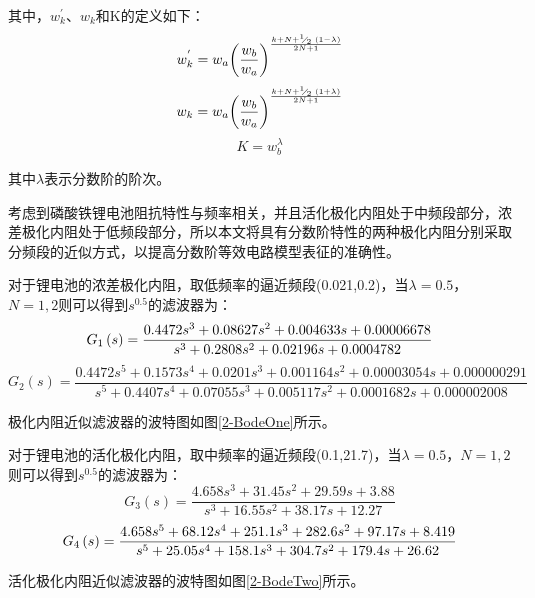 其中，$w_{k}^{'}$、${{w}_{k}}$和K的定义如下：
\begin{equation}
w_{k}^{'}={{w}_{a}}{{\left( \frac{{{w}_{b}}}{{{w}_{a}}} \right)}^{\frac{k+N+{}^{1}\!\!\diagup\!\!{}_{2}\;\left( 1-\lambda  \right)}{2N+1}}}
\end{equation}
\begin{equation}
{{w}_{k}}={{w}_{a}}{{\left( \frac{{{w}_{b}}}{{{w}_{a}}} \right)}^{\frac{k+N+{}^{1}\!\!\diagup\!\!{}_{2}\;\left( 1+\lambda  \right)}{2N+1}}}
\end{equation}
\begin{equation}
K=w_{b}^{\lambda }
\end{equation}

其中$\lambda $表示分数阶的阶次。

考虑到磷酸铁锂电池阻抗特性与频率相关，并且活化极化内阻处于中频段部分，浓差极化内阻处于低频段部分，所以本文将具有分数阶特性的两种极化内阻分别采取分频段的近似方式，以提高分数阶等效电路模型表征的准确性。

对于锂电池的浓差极化内阻，取低频率的逼近频段(0.021,0.2)，当$\lambda =0.5$，$N=1,2$则可以得到${{s}^{0.5}}$的滤波器为：
\begin{equation}
{G_1}\left( s \right) = \frac{{0.4472{s^3} + 0.08627{s^2} + 0.004633s + 0.00006678}}{{{s^3} + 0.2808{s^2} + 0.02196s + {\rm{0}}{\rm{.0004782}}}}
\end{equation}
\begin{equation}
{G_2}\left( s \right) = \frac{{0.4472{s^5} + 0.1573{s^4} + 0.0201{s^3} + 0.001164{s^2} + 0.00003054s + 0.000000291}}{{{s^5} + 0.4407{s^4} + 0.07055{s^3} + 0.005117{s^2} + 0.0001682s + 0.000002008}}
\end{equation}

极化内阻近似滤波器的波特图如图\ref{2-BodeOne}所示。

对于锂电池的活化极化内阻，取中频率的逼近频段(0.1,21.7)，当$\lambda =0.5$，$N=1,2$则可以得到${{s}^{0.5}}$的滤波器为：
\begin{equation}
{G_3}\left( s \right) = \frac{{4.658{s^3} + 31.45{s^2} + 29.59s + 3.88}}{{{s^3} + 16.55{s^2} + 38.17s + 12.27}}
\end{equation}
\begin{equation}
{G_4}\left( s \right) = \frac{{4.658{s^5} + 68.12{s^4} + 251.1{s^3} + 282.6{s^2} + 97.17s + 8.419}}{{{s^5} + 25.05{s^4} + 158.1{s^3} + 304.7{s^2} + 179.{\rm{4}}s + 26.62}}
\end{equation}

活化极化内阻近似滤波器的波特图如图\ref{2-BodeTwo}所示。

